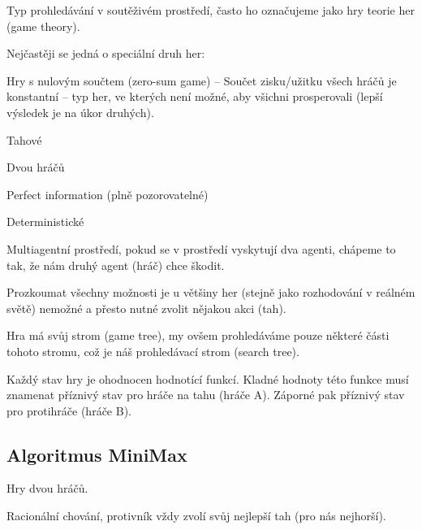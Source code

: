 \begin{compactitem}
    \item Typ prohledávání v soutěživém prostředí, často ho označujeme jako hry teorie her (game theory).

    \item Nejčastěji se jedná o speciální druh her: \begin{compactitem}
        \item Hry s nulovým součtem (zero-sum game) -- Součet zisku/užitku všech hráčů je konstantní -- typ her, ve kterých není možné, aby všichni prosperovali (lepší výsledek je na úkor druhých).
        \item Tahové
        \item Dvou hráčů
        \item Perfect information (plně pozorovatelné)
        \item Deterministické
    \end{compactitem}

    \item Multiagentní prostředí, pokud se v prostředí vyskytují dva agenti, chápeme to tak, že nám druhý agent (hráč) chce škodit.

    \item Prozkoumat všechny možnosti je u většiny her (stejně jako rozhodování v reálném světě) nemožné a přesto nutné zvolit nějakou akci (tah).

    \item Hra má svůj strom (game tree), my ovšem prohledáváme pouze některé části tohoto stromu, což je náš prohledávací strom (search tree).

    \item Každý stav hry je ohodnocen hodnotící funkcí. Kladné hodnoty této funkce musí znamenat příznivý stav pro hráče na tahu (hráče A). Záporné pak příznivý stav pro protihráče (hráče B).
\end{compactitem}

\subsection{Algoritmus MiniMax}

\begin{compactitem}
    \item Hry dvou hráčů.
    \item Racionální chování, protivník vždy zvolí svůj nejlepší tah (pro nás nejhorší).
\end{compactitem}

